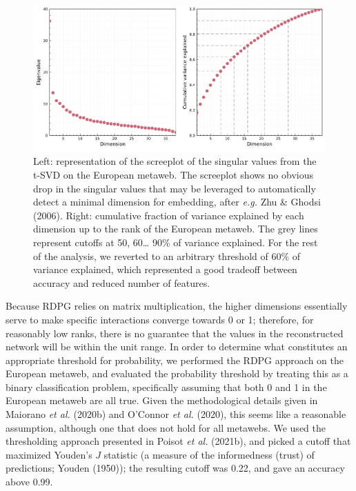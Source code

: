 \documentclass[11pt]{article}
\makeatletter
\def\maxwidth{\ifdim\Gin@nat@width>\linewidth\linewidth
\else\Gin@nat@width\fi}
\let\Oldincludegraphics\includegraphics
\renewcommand{\includegraphics}[1]{\Oldincludegraphics[width=\maxwidth]{#1}}
\makeatother
\begin{document}
\begin{figure}
\hypertarget{fig:scree}{%
\centering
\includegraphics{figures/figure-screeplot.png}
\caption{Left: representation of the screeplot of the singular values
from the t-SVD on the European metaweb. The screeplot shows no obvious
drop in the singular values that may be leveraged to automatically
detect a minimal dimension for embedding, after \emph{e.g.} Zhu \&
Ghodsi (2006). Right: cumulative fraction of variance explained by each
dimension up to the rank of the European metaweb. The grey lines
represent cutoffs at 50, 60\ldots{} 90\% of variance explained. For the
rest of the analysis, we reverted to an arbitrary threshold of 60\% of
variance explained, which represented a good tradeoff between accuracy
and reduced number of features.}\label{fig:scree}
}
\end{figure}

Because RDPG relies on matrix multiplication, the higher dimensions
essentially serve to make specific interactions converge towards 0 or 1;
therefore, for reasonably low ranks, there is no guarantee that the
values in the reconstructed network will be within the unit range. In
order to determine what constitutes an appropriate threshold for
probability, we performed the RDPG approach on the European metaweb, and
evaluated the probability threshold by treating this as a binary
classification problem, specifically assuming that both 0 and 1 in the
European metaweb are all true. Given the methodological details given in
Maiorano \emph{et al.} (2020b) and O'Connor \emph{et al.} (2020), this
seems like a reasonable assumption, although one that does not hold for
all metawebs. We used the thresholding approach presented in Poisot
\emph{et al.} (2021b), and picked a cutoff that maximized Youden's \(J\)
statistic (a measure of the informedness (trust) of predictions; Youden
(1950)); the resulting cutoff was 0.22, and gave an accuracy above 0.99.
\end{document}
